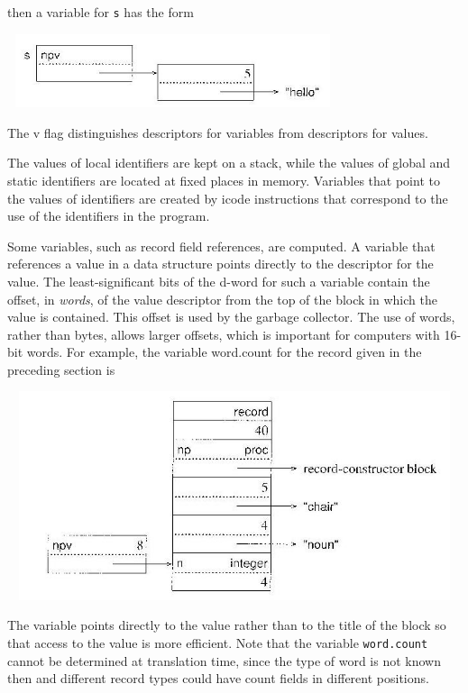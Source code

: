 \noindent then a variable for \texttt{s} has the form

\begin{center}
\includegraphics[width=3.8193in,height=0.8492in]{ib-img/ib-img013.jpg}
\end{center}

\noindent
The v flag distinguishes descriptors for variables from descriptors for values.

The values of local identifiers are kept on a stack, while the values
of global and static identifiers are located at fixed places in
memory. Variables that point to the values of identifiers are created
by icode instructions that correspond to the use of the identifiers in
the program.

Some variables, such as record field references, are computed. A
variable that references a value in a data structure points directly
to the descriptor for the value. The least-significant bits of the
d-word for such a variable contain the offset, in \textit{words}, of
the value descriptor from the top of the block in which the value is
contained. This offset is used by the garbage collector. The use of
words, rather than bytes, allows larger offsets, which is important
for computers with 16-bit words. For example, the variable word.count
for the record given in the preceding section is

\begin{center}
\includegraphics[width=5.2492in,height=2.4098in]{ib-img/ib-img014.jpg}
\end{center}

The variable points directly to the value rather than to the title of
the block so that access to the value is more efficient. Note that the
variable \texttt{word.count} cannot be determined at translation time,
since the type of word is not known then and different record types
could have count fields in different positions.

